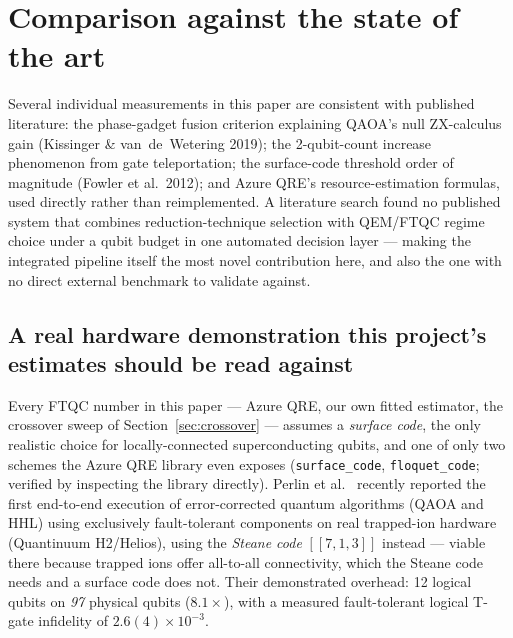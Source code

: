\documentclass[9pt,twocolumn]{extarticle}
\begin{document}
\section{Comparison against the state of the art}
Several individual measurements in this paper are consistent with published
literature: the phase-gadget fusion criterion explaining QAOA's null
ZX-calculus gain (Kissinger \& van~de~Wetering 2019); the 2-qubit-count
increase phenomenon from gate teleportation; the surface-code threshold
order of magnitude (Fowler et al.\ 2012); and Azure QRE's resource-estimation
formulas, used directly rather than reimplemented. A literature search found
no published system that combines reduction-technique selection with
QEM/FTQC regime choice under a qubit budget in one automated decision layer
--- making the integrated pipeline itself the most novel contribution here,
and also the one with no direct external benchmark to validate against.

\subsection{A real hardware demonstration this project's estimates should be read against}
Every FTQC number in this paper --- Azure QRE, our own fitted estimator,
the crossover sweep of Section~\ref{sec:crossover} --- assumes a
\emph{surface code}, the only realistic choice for locally-connected
superconducting qubits, and one of only two schemes the Azure QRE library
even exposes (\texttt{surface\_code}, \texttt{floquet\_code}; verified by
inspecting the library directly). Perlin et al.\ \cite{perlin2026}
recently reported the first end-to-end execution of error-corrected quantum
algorithms (QAOA and HHL) using exclusively fault-tolerant components on
real trapped-ion hardware (Quantinuum H2/Helios), using the
\emph{Steane code} $[[7,1,3]]$ instead --- viable there because trapped
ions offer all-to-all connectivity, which the Steane code needs and a
surface code does not. Their demonstrated overhead: 12 logical qubits on
\emph{97} physical qubits ($8.1\times$), with a measured fault-tolerant
logical T-gate infidelity of $2.6(4)\times10^{-3}$.
\end{document}
